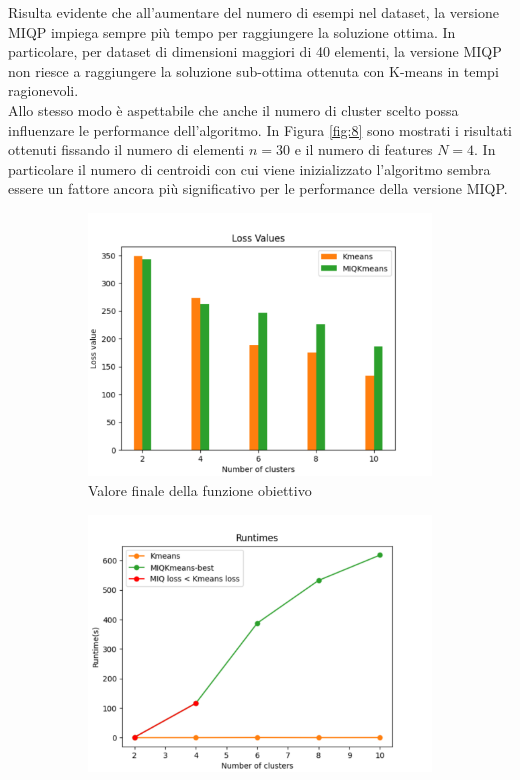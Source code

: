 \documentclass{article}
\begin{document}
    Risulta evidente che all'aumentare del numero di esempi nel dataset, la versione MIQP impiega sempre più tempo per raggiungere la soluzione ottima. In particolare, per dataset di dimensioni maggiori di 40 elementi, la versione MIQP non riesce a raggiungere la soluzione sub-ottima ottenuta con K-means in tempi ragionevoli.\\
    Allo stesso modo è aspettabile che anche il numero di cluster scelto possa influenzare le performance dell'algoritmo. In Figura \ref{fig:8} sono mostrati i risultati ottenuti fissando il numero di elementi $n=30$ e il numero di features $N=4$. In particolare il numero di centroidi con cui viene inizializzato l'algoritmo sembra essere un fattore ancora più significativo per le performance della versione MIQP.
    \begin{figure}[H]
     \centering
     \begin{subfigure}[t]{0.485\linewidth}
         \centering
         \includegraphics[width=\linewidth]{../results/plots/loss_centers_heart}
         \caption{Valore finale della funzione obiettivo}
     \end{subfigure}
     \hfill
     \begin{subfigure}[t]{0.49\linewidth}
         \centering
         \includegraphics[width=\linewidth]{../results/plots/runtime_centers_heart}

\end{subfigure}
\end{figure}
\end{document}
